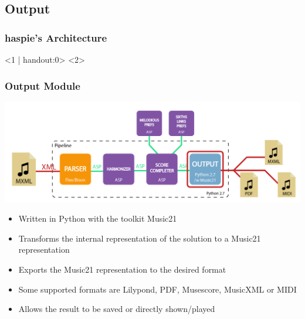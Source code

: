\documentclass[english]{beamer}
\begin{document}
\subsection{Output}
	\begin{frame}
		\frametitle{haspie's Architecture}
		\begin{center}
		<1 | handout:0>
		<2>
		\end{center}
	\end{frame}
		\begin{frame}[t]
		\frametitle{Output Module}
		\begin{center}
				\includegraphics[width=0.6\linewidth]{imagenes/arch_trans/arquitectura_final_out-01.png}
				\end{center}
			\begin{itemize}
				\item Written in \alert{Python} with the toolkit \alert{Music21}
				\item Transforms the internal representation of the solution to a Music21 representation
				\pause
				\item Exports the Music21 representation to the desired format
				\item Some supported formats are Lilypond, PDF, Musescore, MusicXML or MIDI
				\item Allows the result to be \alert{saved or directly shown/played}
			\end{itemize}
		\end{frame}
\end{document}
